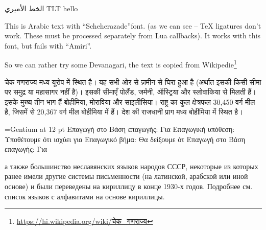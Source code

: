 \documentclass{article}
\begin{document}
 الخط الأميري {\textdir TLT hello}

\egroup

\ahoj
{}

This is  Arabic text with ``Scheherazade''font. (as we can see -- TeX ligatures
don't work. These must be processed separately from Lua callbacks). 
It works with this font, but fails with ``Amiri''. 

\siddhanta
\def\UrlFont{\siddhanta}
So we can rather try some Devanagari, the text is copied from Wikipedie\footnote{\url{https://hi.wikipedia.org/wiki/चेक_गणराज्य}}


चेक गणराज्य मध्य यूरोप में स्थित है। यह सभी ओर से ज़मीन से घिरा हुआ है (अर्थात इसकी किसी सीमा पर समुद्र या महासागर नहीं है)। इसकी सीमाएँ पोलैंड, जर्मनी, ऑस्ट्रिया और स्लोवाकिया से मिलती हैं। इसके मुख्य तीन भाग हैं बोहीमिया, मोराविया और साइलीसिया। राष्ट्र का कुल क्षेत्रफल 30,450 वर्ग मील है, जिसमें से 20,367 वर्ग मील बोहीमिया में हैं। देश की राजधानी प्राग मध्य बोहीमिया में स्थित है।

\font\gentium={Gentium} at 12 pt
\gentium
Επαγωγή στο 
Βάση επαγωγής: Για 
Επαγωγική υπόθεση: Υποθέτουμε ότι ισχύει για 
Επαγωγικό βήμα: Θα δείξουμε ότ
Επαγωγή στο
Βάση επαγωγής: Για 

\gentium

а также большинство неславянских языков народов СССР, некоторые из которых
ранее имели другие системы письменности (на латинской, арабской или иной
основе) и были переведены на кириллицу в конце 1930-х годов. Подробнее см.
список языков с алфавитами на основе кириллицы.  
\end{document}
